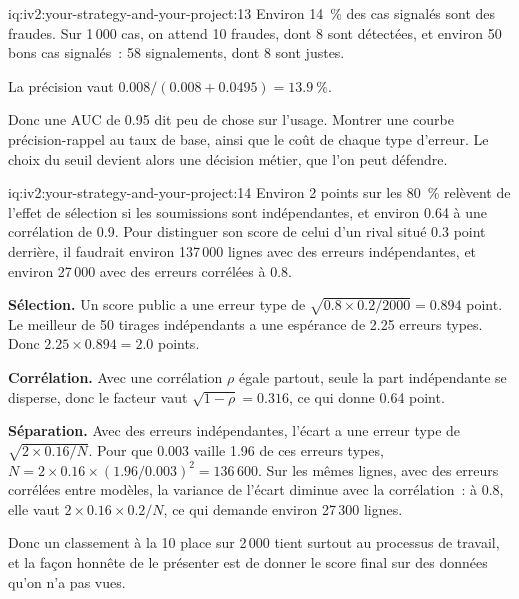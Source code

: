 \begin{solution}{iq:iv2:your-strategy-and-your-project:13}
Environ 14~\% des cas signalés sont des fraudes. Sur 1\,000 cas, on attend 10 fraudes, dont 8 sont détectées, et environ 50 bons cas signalés~: 58 signalements, dont 8 sont justes.

La précision vaut $0.008/(0.008 + 0.0495) = 13.9~\%$.

Donc une AUC de 0.95 dit peu de chose sur l'usage. Montrer une courbe précision-rappel au taux de base, ainsi que le coût de chaque type d'erreur. Le choix du seuil devient alors une décision métier, que l'on peut défendre.

\end{solution}

\begin{solution}{iq:iv2:your-strategy-and-your-project:14}
Environ 2 points sur les 80~\% relèvent de l'effet de sélection si les soumissions sont indépendantes, et environ 0.64 à une corrélation de 0.9. Pour distinguer son score de celui d'un rival situé 0.3 point derrière, il faudrait environ 137\,000 lignes avec des erreurs indépendantes, et environ 27\,000 avec des erreurs corrélées à 0.8.

\textbf{Sélection.} Un score public a une erreur type de $\sqrt{0.8 \times 0.2/2000} = 0.894$ point. Le meilleur de 50 tirages indépendants a une espérance de 2.25 erreurs types. Donc $2.25 \times 0.894 = 2.0$ points.

\textbf{Corrélation.} Avec une corrélation $\rho$ égale partout, seule la part indépendante se disperse, donc le facteur vaut $\sqrt{1 - \rho} = 0.316$, ce qui donne 0.64 point.

\textbf{Séparation.} Avec des erreurs indépendantes, l'écart a une erreur type de $\sqrt{2 \times 0.16/N}$. Pour que $0.003$ vaille 1.96 de ces erreurs types, $N = 2 \times 0.16 \times (1.96/0.003)^2 = 136\,600$. Sur les mêmes lignes, avec des erreurs corrélées entre modèles, la variance de l'écart diminue avec la corrélation~: à 0.8, elle vaut $2 \times 0.16 \times 0.2/N$, ce qui demande environ 27\,300 lignes.

Donc un classement à la 10 place sur 2\,000 tient surtout au processus de travail, et la façon honnête de le présenter est de donner le score final sur des données qu'on n'a pas vues.

\end{solution}

